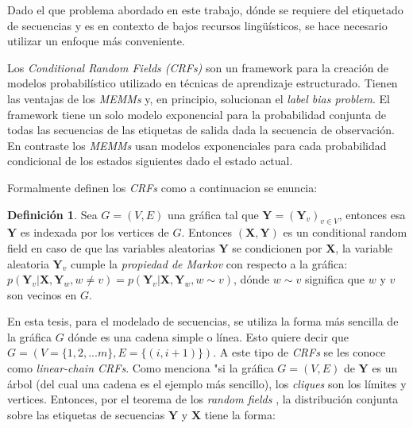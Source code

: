 \documentclass[letterpaper,12pt,oneside]{scrbook}
\theoremstyle{definition}
\newtheorem{definition}{Definición}
\begin{document}
	
	Dado el que problema abordado en este trabajo, dónde se requiere del etiquetado de secuencias y es en contexto de bajos recursos lingüísticos, se hace necesario utilizar un enfoque más conveniente.

	
	Los \textit{Conditional Random Fields (CRFs)} son un framework para la creación de modelos probabilístico utilizado en técnicas de aprendizaje estructurado. Tienen las ventajas de los \textit{MEMMs} y, en principio, solucionan el \emph{label bias problem}. El framework tiene un solo modelo exponencial para la probabilidad conjunta de todas las secuencias de las etiquetas de salida dada la secuencia de observación. En contraste los \emph{MEMMs} usan modelos exponenciales para cada probabilidad condicional de los estados siguientes dado el estado actual.

	
	Formalmente \citet{lafferty2001conditional} definen los \textit{CRFs} como a continuacion se enuncia:

	
	\begin{definition}

		Sea $G = (V,E)$ una gráfica tal que $\mathbf{Y} = (\mathbf{Y}_{v})_{v \in V}$, entonces esa $\mathbf{Y}$ es indexada por los vertices de $G$. Entonces $(\mathbf{X}, \mathbf{Y})$ es un \textsf{conditional random field} en caso de que las variables aleatorias $\mathbf{Y}$ se condicionen por $\mathbf{X}$, la variable aleatoria $\mathbf{Y}_{v}$ cumple la \textit{propiedad de Markov} con respecto a la gráfica: $p(\mathbf{Y}_{v}|\mathbf{X},\mathbf{Y}_{w},w \ne v) = p(\mathbf{Y}_{v}|\mathbf{X},\mathbf{Y}_{w},w \sim v)$, dónde $w \sim v$ significa que $w$ y $v$ son vecinos en $G$.

	\end{definition}

	
	En esta tesis, para el modelado de secuencias, se utiliza la forma más sencilla de la gráfica $G$ dónde es una cadena simple o línea. Esto quiere decir que $G = (V = \{1,2,...m\}, E = \{(i,i+1)\})$. A este tipo de \textit{CRFs} se les conoce como \textit{linear-chain CRFs}. Como menciona \citet{lafferty2001conditional} "si la gráfica $G = (V,E)$ de $\mathbf{Y}$ es un árbol (del cual una cadena es el ejemplo más sencillo), los \textit{cliques} son los límites y vertices. Entonces, por el teorema de los \textit{random fields} \citep{hammersley1971markov}, la distribución conjunta sobre las etiquetas de secuencias $\mathbf{Y}$ y $\mathbf{X}$ tiene la forma:

	

\end{document}
